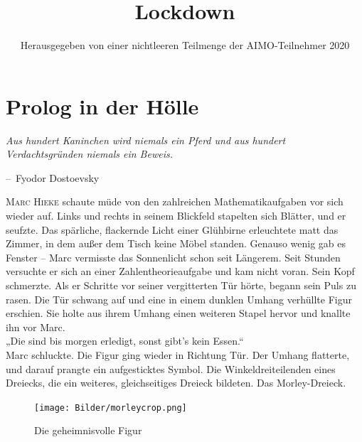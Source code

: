 \documentclass[oneside]{memoir}
\title{Lockdown}
\author{Herausgegeben von einer nichtleeren Teilmenge der AIMO-Teilnehmer 2020}
\makeatletter
\newenvironment{chapquote}[2][2em]
  {\setlength{\@tempdima}{#1}%
   \def\chapquote@author{#2}%
   \parshape 1 \@tempdima \dimexpr\textwidth-2\@tempdima\relax%
   \itshape}
  {\par\normalfont\hfill--\ \chapquote@author\hspace*{\@tempdima}\par\bigskip}
\makeatother
\begin{document}
\begin{titlingpage}
\maketitle
\end{titlingpage}
\newpage
\thispagestyle{empty}
\begin{center}
\end{center}
\setcounter{page}{2}
\chapter{Prolog in der Hölle}

\begin{chapquote}{Fyodor Dostoevsky}
\glqq Aus hundert Kaninchen wird niemals ein Pferd und aus hundert Verdachtsgründen niemals ein Beweis.\grqq
\end{chapquote}

\lettrine{M}{arc Hieke} schaute müde von den zahlreichen Mathematikaufgaben vor sich wieder auf. Links und rechts in seinem Blickfeld stapelten sich Blätter, und er seufzte. Das spärliche, flackernde Licht einer Glühbirne erleuchtete matt das Zimmer, in dem außer dem Tisch keine Möbel standen. Genauso wenig gab es Fenster -- Marc vermisste das Sonnenlicht schon seit Längerem. Seit Stunden versuchte er sich an einer Zahlentheorieaufgabe und kam nicht voran. Sein Kopf schmerzte. Als er Schritte vor seiner vergitterten Tür hörte, begann sein Puls zu rasen. Die Tür schwang auf und eine in einem dunklen Umhang verhüllte Figur erschien. Sie holte aus ihrem Umhang einen weiteren Stapel hervor und knallte ihn vor Marc. \\
„Die sind bis morgen erledigt, sonst gibt's kein Essen.“ \\
Marc schluckte. Die Figur ging wieder in Richtung Tür. Der Umhang flatterte, und darauf prangte ein aufgesticktes Symbol. Die Winkeldreiteilenden eines Dreiecks, die ein weiteres, gleichseitiges Dreieck bildeten. Das Morley-Dreieck.
\begin{figure}[htbp] 
  \centering
     \texttt{[image: Bilder/morleycrop.png]}
  \caption{Die geheimnisvolle Figur}
\end{figure}
\end{document}
